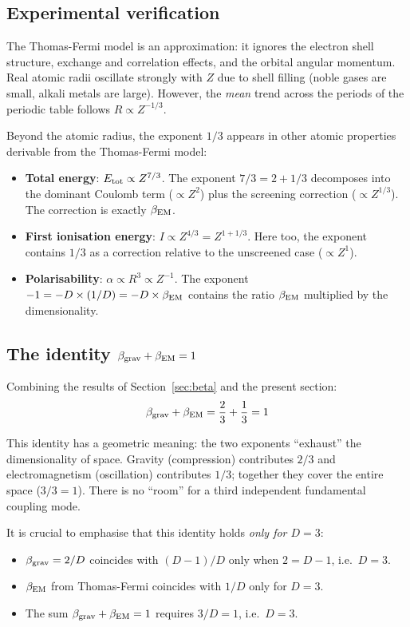 \documentclass[10pt,a4paper]{article}
\begin{document}
\subsection{Experimental verification}

The Thomas-Fermi model is an approximation: it ignores the electron shell structure, exchange and correlation effects, and the orbital angular momentum. Real atomic radii oscillate strongly with $Z$ due to shell filling (noble gases are small, alkali metals are large). However, the \textit{mean} trend across the periods of the periodic table follows $R \propto Z^{-1/3}$.

Beyond the atomic radius, the exponent $1/3$ appears in other atomic properties derivable from the Thomas-Fermi model:
\begin{itemize}
\item \textbf{Total energy}: $E_{\rm tot} \propto Z^{7/3}$. The exponent $7/3 = 2 + 1/3$ decomposes into the dominant Coulomb term ($\propto Z^2$) plus the screening correction ($\propto Z^{1/3}$). The correction is exactly $\beta_{\rm EM}$.
\item \textbf{First ionisation energy}: $I \propto Z^{4/3} = Z^{1 + 1/3}$. Here too, the exponent contains $1/3$ as a correction relative to the unscreened case ($\propto Z^1$).
\item \textbf{Polarisability}: $\alpha \propto R^3 \propto Z^{-1}$. The exponent $-1 = -D \times (1/D) = -D \times \beta_{\rm EM}$ contains the ratio $\beta_{\rm EM}$ multiplied by the dimensionality.
\end{itemize}

\subsection{The identity $\beta_{\rm grav} + \beta_{\rm EM} = 1$}

Combining the results of Section~\ref{sec:beta} and the present section:
\begin{equation}
\beta_{\rm grav} + \beta_{\rm EM} = \frac{2}{3} + \frac{1}{3} = 1
\end{equation}

This identity has a geometric meaning: the two exponents ``exhaust'' the dimensionality of space. Gravity (compression) contributes $2/3$ and electromagnetism (oscillation) contributes $1/3$; together they cover the entire space ($3/3 = 1$). There is no ``room'' for a third independent fundamental coupling mode.

It is crucial to emphasise that this identity holds \textit{only for $D = 3$}:
\begin{itemize}
\item $\beta_{\rm grav} = 2/D$ coincides with $(D-1)/D$ only when $2 = D-1$, i.e.\ $D = 3$.
\item $\beta_{\rm EM}$ from Thomas-Fermi coincides with $1/D$ only for $D = 3$.
\item The sum $\beta_{\rm grav} + \beta_{\rm EM} = 1$ requires $3/D = 1$, i.e.\ $D = 3$.
\end{itemize}
\end{document}

